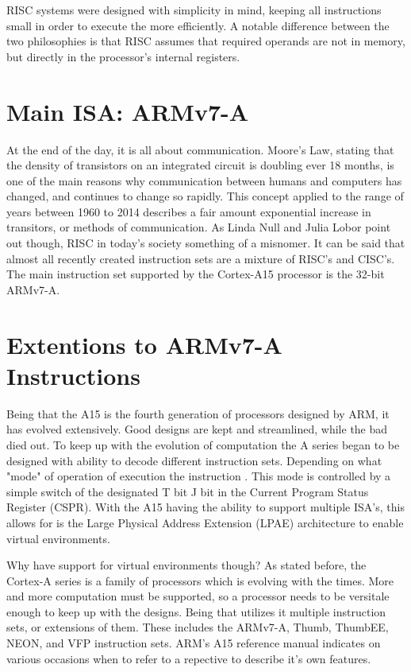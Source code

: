 \documentclass[12pt]{scrreprt}
\begin{document}
	RISC systems were designed with simplicity in mind, keeping all instructions small in order to execute the more efficiently. A notable
	difference between the two philosophies is that RISC assumes that required operands are not in memory, but directly in the processor's
	internal registers.

	\section{Main ISA: ARMv7-A}

	At the end of the day, it is all about communication. Moore's Law, stating that the density of transistors on an integrated circuit is doubling 
	ever 18 months, is one of the main reasons why communication between humans and computers has changed, and continues to change so rapidly. This 
	concept applied to the range of years between 1960 to 2014 describes a fair amount exponential increase in transitors, or methods of 
	communication. As Linda Null and Julia Lobor point out though, RISC in today's society something of a misnomer. It can be said that 
	almost all recently created instruction sets are a mixture of RISC's and CISC's. The main instruction set supported by the Cortex-A15 processor 
	is the 32-bit ARMv7-A. 

	\section{Extentions to ARMv7-A Instructions}

	Being that the A15 is the fourth generation of processors designed by ARM, it has evolved extensively. Good designs are kept and streamlined, while
	the bad died out. To keep up with the evolution of computation the A series began to be designed with ability to decode different instruction sets. 
	Depending on what "mode" of operation of execution the instruction . 
	This mode is controlled by a simple switch of the designated T bit  J bit in the Current Program Status Register (CSPR). With the A15 having the ability to support multiple ISA's, this allows for is the Large Physical Address Extension (LPAE) architecture to enable virtual environments.

	Why have support for virtual environments though? As stated before, the Cortex-A series is a family of processors which is evolving with the times.
	More and more computation must be supported, so a processor needs to be versitale enough to keep up with the designs.
	Being that utilizes it multiple instruction sets, or extensions of them. These includes the ARMv7-A, Thumb, ThumbEE, NEON, and VFP instruction sets. ARM's A15 reference manual indicates on various occasions when to refer to a repective to describe it's own features.
\end{document}
